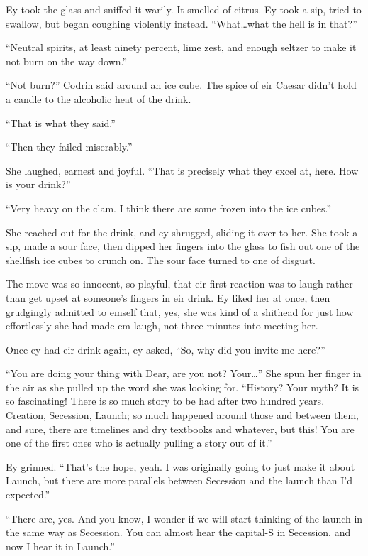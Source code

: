 Ey took the glass and sniffed it warily. It smelled of citrus. Ey took a sip, tried to swallow, but began coughing violently instead. ``What\ldots what the hell is in that?''

``Neutral spirits, at least ninety percent, lime zest, and enough seltzer to make it not burn on the way down.''

``Not burn?'' Codrin said around an ice cube. The spice of eir Caesar didn't hold a candle to the alcoholic heat of the drink.

``That is what they said.''

``Then they failed miserably.''

She laughed, earnest and joyful. ``That is precisely what they excel at, here. How is your drink?''

``Very heavy on the clam. I think there are some frozen into the ice cubes.''

She reached out for the drink, and ey shrugged, sliding it over to her. She took a sip, made a sour face, then dipped her fingers into the glass to fish out one of the shellfish ice cubes to crunch on. The sour face turned to one of disgust.

The move was so innocent, so playful, that eir first reaction was to laugh rather than get upset at someone's fingers in eir drink. Ey liked her at once, then grudgingly admitted to emself that, yes, she was kind of a shithead for just how effortlessly she had made em laugh, not three minutes into meeting her.

Once ey had eir drink again, ey asked, ``So, why did you invite me here?''

``You are doing your thing with Dear, are you not? Your\ldots{}'' She spun her finger in the air as she pulled up the word she was looking for. ``History? Your myth? It is so fascinating! There is so much story to be had after two hundred years. Creation, Secession, Launch; so much happened around those and between them, and sure, there are timelines and dry textbooks and whatever, but this! You are one of the first ones who is actually pulling a story out of it.''

Ey grinned. ``That's the hope, yeah. I was originally going to just make it about Launch, but there are more parallels between Secession and the launch than I'd expected.''

``There are, yes. And you know, I wonder if we will start thinking of the launch in the same way as Secession. You can almost hear the capital-S in Secession, and now I hear it in Launch.''

